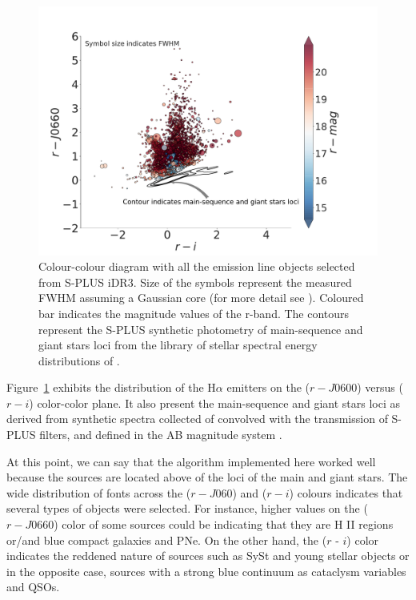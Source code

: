 \documentclass[fleqn,usenatbib]{mnras}
\begin{document}
\begin{figure}
	\includegraphics[width=1.1\linewidth]{Figs/final-emitters.pdf}
        \caption{Colour-colour diagram with all the emission line objects selected
          from S-PLUS iDR3. Size of the symbols represent the measured FWHM assuming
          a Gaussian core (for more detail see \citealt{Fernandes:2021}). Coloured
          bar indicates the magnitude values of the r-band. The contours represent
          the S-PLUS synthetic photometry of main-sequence and giant stars loci from 
          the library of stellar spectral energy distributions of \citet{Pickles:1998}.}
    \label{fig:emission}
\end{figure} 

Figure~\ref{fig:emission} exhibits the distribution of the H{$\alpha$} emitters on the
($r - J0600$) versus ($r - i$) color-color plane. 
It also present the main-sequence and giant stars loci as derived from synthetic spectra collected of \citet{Pickles:1998} convolved with the transmission of S-PLUS filters, 
and defined in the AB magnitude system \citep{Oke:1983}.

At this point, we can say that
the algorithm implemented here worked well because the sources
are located  above of the loci of the main and giant stars. The wide distribution of fonts across
the ($r - J060$) and ($r - i$) colours indicates that several types of objects were selected.
For instance, higher values on the  ($r - J0660$) color of some sources could be indicating
that they are H II regions or/and blue compact galaxies and PNe. On the other hand, the 
($r$ - $i$) color indicates the  reddened nature of sources such as SySt and young stellar objects
or in the opposite case, sources with a strong blue continuum as cataclysm variables and QSOs.
\end{document}
